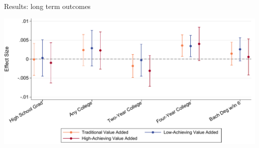 \documentclass[t,aspectratio=169]{beamer}
\begin{document}
\begin{frame}{Results: long term outcomes}
    \begin{center}
    \includegraphics[width=.9\textwidth]{Working_Paper/WP_Figures/fig2b_longterm.pdf}
    \end{center}

\end{frame}
\end{document}
